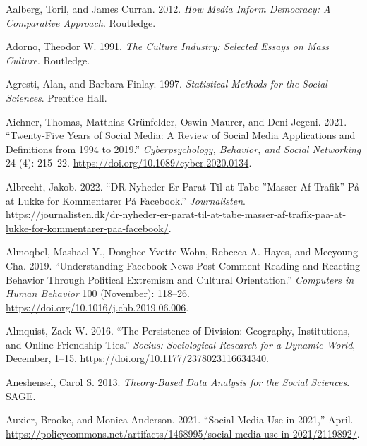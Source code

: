\documentclass[
]{article}
\newlength{\cslhangindent}
\newlength{\cslentryspacingunit} %
\newenvironment{CSLReferences}[2] %
 {%
  \setlength{\parindent}{0pt}
  \ifodd #1
  \let\oldpar\par
  \def\par{\hangindent=\cslhangindent\oldpar}
  \fi
  \setlength{\parskip}{#2\cslentryspacingunit}
 }%
 {}
\begin{document}
\hypertarget{refs}{}
\begin{CSLReferences}{1}{0}
\leavevmode{}%
Aalberg, Toril, and James Curran. 2012. \emph{How {Media} {Inform}
{Democracy}: {A} {Comparative} {Approach}}. Routledge.

\leavevmode{}%
Adorno, Theodor W. 1991. \emph{The {Culture} {Industry}: {Selected}
{Essays} on {Mass} {Culture}}. Routledge.

\leavevmode{}%
Agresti, Alan, and Barbara Finlay. 1997. \emph{Statistical {Methods} for
the {Social} {Sciences}}. Prentice Hall.

\leavevmode{}%
Aichner, Thomas, Matthias Grünfelder, Oswin Maurer, and Deni Jegeni.
2021. {``Twenty-{Five} {Years} of {Social} {Media}: {A} {Review} of
{Social} {Media} {Applications} and {Definitions} from 1994 to 2019.''}
\emph{Cyberpsychology, Behavior, and Social Networking} 24 (4): 215--22.
\url{https://doi.org/10.1089/cyber.2020.0134}.

\leavevmode{}%
Albrecht, Jakob. 2022. {``{DR} {Nyheder} Er Parat Til at Tabe ''Masser
Af Trafik'' På at Lukke for Kommentarer På {Facebook}.''}
\emph{Journalisten}.
\url{https://journalisten.dk/dr-nyheder-er-parat-til-at-tabe-masser-af-trafik-paa-at-lukke-for-kommentarer-paa-facebook/}.

\leavevmode{}%
Almoqbel, Mashael Y., Donghee Yvette Wohn, Rebecca A. Hayes, and
Meeyoung Cha. 2019. {``Understanding {Facebook} News Post Comment
Reading and Reacting Behavior Through Political Extremism and Cultural
Orientation.''} \emph{Computers in Human Behavior} 100 (November):
118--26. \url{https://doi.org/10.1016/j.chb.2019.06.006}.

\leavevmode{}%
Almquist, Zack W. 2016. {``The {Persistence} of {Division}: {Geography},
{Institutions}, and {Online} {Friendship} {Ties}.''} \emph{Socius:
Sociological Research for a Dynamic World}, December, 1--15.
\url{https://doi.org/10.1177/2378023116634340}.

\leavevmode{}%
Aneshensel, Carol S. 2013. \emph{Theory-{Based} {Data} {Analysis} for
the {Social} {Sciences}}. SAGE.

\leavevmode{}%
Auxier, Brooke, and Monica Anderson. 2021. {``Social {Media} {Use} in
2021,''} April.
\url{https://policycommons.net/artifacts/1468995/social-media-use-in-2021/2119892/}.


\end{CSLReferences}
\end{document}
